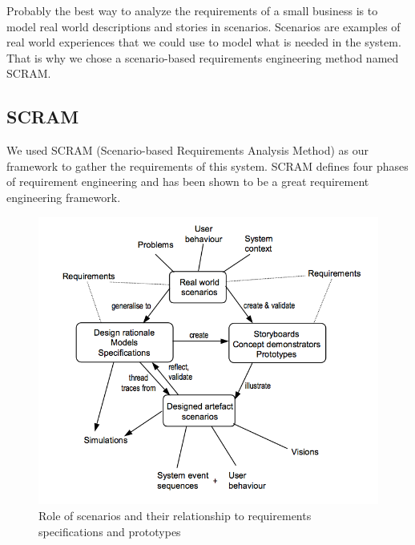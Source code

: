 Probably the best way to analyze the requirements of a small business is to model real world descriptions and stories in scenarios. Scenarios are examples of real world experiences that we could use to model what is needed in the system. That is why we chose a scenario-based requirements engineering method named SCRAM.

\subsection{SCRAM}
We used SCRAM (Scenario-based Requirements Analysis Method) as our framework to gather the requirements of this system.
SCRAM defines four phases of requirement engineering and has been shown to be a great requirement engineering framework.


\begin{figure}[htb!p]
\centering
\includegraphics[width=\linewidth]{fig/REscenario.png}
  \caption{Role of scenarios and their relationship to requirements specifications and prototypes ~\cite{REScenario}}
\label{fig:REscenario}
\end{figure}


